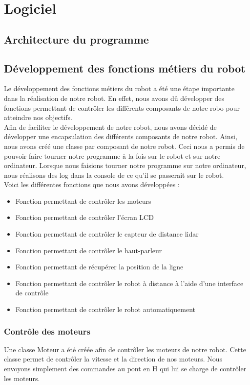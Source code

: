\section{Logiciel}
\subsection{Architecture du programme}
\subsection{Développement des fonctions métiers du robot}
Le développement des fonctions métiers du robot a été une étape importante dans la réalisation de notre robot. En effet, nous avons dû développer des fonctions permettant de contrôler les différents composants de notre robo pour atteindre nos objectifs.
\\
Afin de faciliter le développement de notre robot, nous avons décidé de développer une encapsulation des différents composants de notre robot. Ainsi, nous avons créé une classe par composant de notre robot. Ceci nous a permis de pouvoir faire tourner notre programme à la fois sur le robot et sur notre ordinateur. Lorsque nous faisions tourner notre programme sur notre ordinateur, nous réalisons des log dans la console de ce qu'il se passerait sur le robot.
\\
Voici les différentes fonctions que nous avons développées :
\begin{itemize}
    \item Fonction permettant de contrôler les moteurs
    \item Fonction permettant de contrôler l'écran LCD
    \item Fonction permettant de contrôler le capteur de distance lidar
    \item Fonction permettant de contrôler le haut-parleur
    \item Fonction permettant de récupérer la position de la ligne
    \item Fonction permettant de contrôler le robot à distance à l'aide d'une interface de contrôle
    \item Fonction permettant de contrôler le robot automatiquement
\end{itemize}

\subsubsection{Contrôle des moteurs}
Une classe Moteur a été créée afin de contrôler les moteurs de notre robot. Cette classe permet de contrôler la vitesse et la direction de nos moteurs.
Nous envoyons simplement des commandes au pont en H qui lui se charge de contrôler les moteurs.

